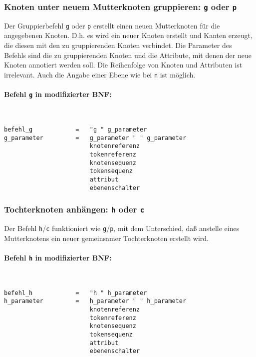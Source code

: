 \documentclass[12pt]{scrartcl}
\begin{document}
\subsubsection{Knoten unter neuem Mutterknoten gruppieren: \texttt{g} oder \texttt{p}}

Der Gruppierbefehl \texttt{g} oder \texttt{p} erstellt einen neuen Mutterknoten für die angegebenen Knoten. D.h. es wird ein neuer Knoten erstellt und Kanten erzeugt, die diesen mit den zu gruppierenden Knoten verbindet. Die Parameter des Befehls sind die zu gruppierenden Knoten und die Attribute, mit denen der neue Knoten annotiert werden soll. Die Reihenfolge von Knoten und Attributen ist irrelevant. Auch die Angabe einer Ebene wie bei \texttt{n} ist möglich.
\paragraph*{Befehl \texttt{g} in modifizierter BNF:}
~
\begin{framed}
\begin{lstlisting}
befehl_g            =   "g " g_parameter
g_parameter         =   g_parameter " " g_parameter
                        knotenreferenz
                        tokenreferenz
                        knotensequenz
                        tokensequenz
                        attribut
                        ebenenschalter
\end{lstlisting}
\end{framed}


\subsubsection{Tochterknoten anhängen: \texttt{h} oder \texttt{c}}

Der Befehl \texttt{h}/\texttt{c} funktioniert wie \texttt{g}/\texttt{p}, mit dem Unterschied, daß anstelle eines Mutterknotens ein neuer gemeinsamer Tochterknoten erstellt wird.
\paragraph*{Befehl \texttt{h} in modifizierter BNF:}
~
\begin{framed}
\begin{lstlisting}
befehl_h            =   "h " h_parameter
h_parameter         =   h_parameter " " h_parameter
                        knotenreferenz
                        tokenreferenz
                        knotensequenz
                        tokensequenz
                        attribut
                        ebenenschalter
\end{lstlisting}
\end{framed}
\end{document}
